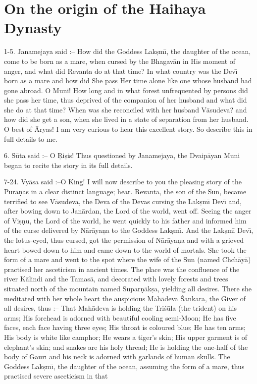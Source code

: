 \chapter{On the origin of the Haihaya Dynasty}

1-5. Janamejaya said :-- How did the Goddess Lak\d{s}m\={\i}, the daughter of the ocean, come to be born as a mare, when cursed by the Bhagav\=an in His moment of anger, and what did Revanta do at that time? In what country was the Dev\={\i} born as a mare and how did She pass Her time alone like one whose husband had gone abroad. O Muni! How long and in what forest unfrequented by persons did she pass her time, thus deprived of the companion of her husband and what did she do at that time? When was she reconciled with her husband V\=asudeva? and how did she get a son, when she lived in a state of separation from her husband. O best of \=Aryas! I am very curious to hear this excellent story. So describe this in full details to me.

6. S\=uta said :-- O \d{R}i\d{s}is! Thus questioned by Janamejaya, the Dvaip\=ayan Muni began to recite the story in its full details.

7-24. Vy\=asa said :--O King! I will now describe to you the pleasing story of the Pur\=a\d{n}as in a clear distinct language; hear. Revanta, the son of the Sun, became terrified to see V\=asudeva, the Deva of the Devas cursing the Lak\d{s}m\={\i} Dev\={\i} and, after bowing down to Jan\=ardan, the Lord of the world, went off. Seeing the anger of Vi\d{s}\d{n}u, the Lord of the world, he went quickly to his father and informed him of the curse delivered by N\=ar\=aya\d{n}a to the Goddess Lak\d{s}m\={\i}. And the Lak\d{s}m\={\i} Dev\={\i}, the lotus-eyed, thus cursed, got the permission of N\=ar\=aya\d{n}a and with a grieved heart bowed down to him and came down to the world of mortals. She took the form of a mare and went to the spot where the wife of the Sun (named Chch\=ay\=a) practised her asceticism in ancient times. The place was the confluence of the river K\=alindi and the Tamas\=a, and decorated with lovely forests and trees situated north of the mountain named Supar\d{n}\=ak\d{s}a, yielding all desires. There she meditated with her whole heart the auspicious Mah\=adeva \'Sankara, the Giver of all desires, thus :-- That Mah\=adeva is holding the Tri\'s\=ula (the trident) on his arms; His forehead is adorned with beautiful cooling semi-Moon; He has five faces, each face having three eyes; His throat is coloured blue; He has ten arms; His body is white like camphor; He wears a tiger's skin; His upper garment is of elephant's skin; and snakes are his holy thread; He is holding the one-half of the body of Gaur\={\i} and his neck is adorned with garlands of human skulls. The Goddess Lak\d{s}m\={\i}, the daughter of the ocean, assuming the form of a mare, thus practised severe asceticism in that


